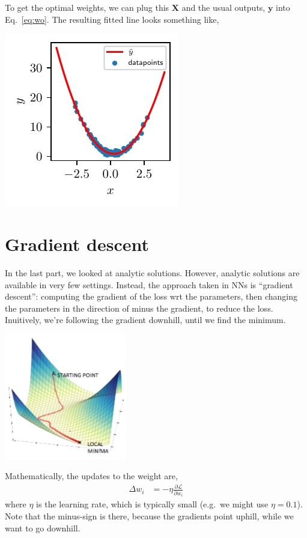 \documentclass{article}
\newcommand{\dd}[2][]{\frac{\partial #1}{\partial #2}}
\newcommand{\y}{\mathbf{y}}
\newcommand{\X}{\mathbf{X}}
\renewcommand{\L}{\mathcal{L}}
\begin{document}
To get the optimal weights, we can plug this $\X$ and the usual outputs, $\y$ into Eq.~\eqref{eq:wo}.
The resulting fitted line looks something like,
\begin{center}
  \includegraphics{quad.pdf}
\end{center}

\section{Gradient descent}

In the last part, we looked at analytic solutions.
However, analytic solutions are available in very few settings.
Instead, the approach taken in NNs is ``gradient descent'': computing the gradient of the loss wrt the parameters, then changing the parameters in the direction of minus the gradient, to reduce the loss.
Inuitively, we're following the gradient downhill, until we find the minimum.
\begin{center}
  \includegraphics[width=0.4\textwidth]{grad_descent}
\end{center}

Mathematically, the updates to the weight are,
\begin{align}
  \Delta w_i &= - \eta \dd[\L]{w_i}
\end{align}
where $\eta$ is the learning rate, which is typically small (e.g.\ we might use $\eta=0.1$).  Note that the minus-sign is there, because the gradients point uphill, while we want to go downhill.
\end{document}
